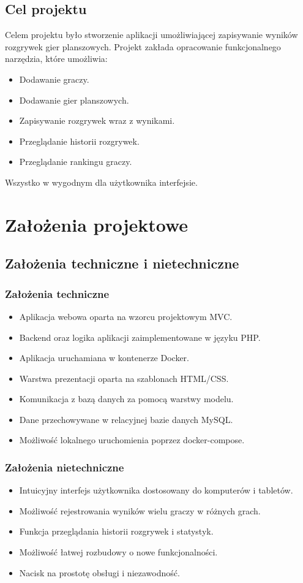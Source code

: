 \documentclass[12pt,a4paper]{article}
\begin{document}
\subsection{Cel projektu}
Celem projektu było stworzenie aplikacji umożliwiającej zapisywanie wyników rozgrywek gier planszowych. Projekt zakłada opracowanie funkcjonalnego narzędzia, które umożliwia:
\begin{itemize}
	\item Dodawanie graczy.
	\item Dodawanie gier planszowych.
	\item Zapisywanie rozgrywek wraz z wynikami.
	\item Przeglądanie historii rozgrywek.
	\item Przeglądanie rankingu graczy.
\end{itemize}
Wszystko w wygodnym dla użytkownika interfejsie.

\pagebreak
\section{Założenia projektowe}

\subsection{Założenia techniczne i nietechniczne}
\subsubsection{Założenia techniczne}
\begin{itemize}
	\item Aplikacja webowa oparta na wzorcu projektowym MVC.
	\item Backend oraz logika aplikacji zaimplementowane w języku PHP.
	\item Aplikacja uruchamiana w kontenerze Docker.
	\item Warstwa prezentacji oparta na szablonach HTML/CSS.
	\item Komunikacja z bazą danych za pomocą warstwy modelu.
	\item Dane przechowywane w relacyjnej bazie danych MySQL.
	\item Możliwość lokalnego uruchomienia poprzez docker-compose.
\end{itemize}

\subsubsection{Założenia nietechniczne}
\begin{itemize}
	\item Intuicyjny interfejs użytkownika dostosowany do komputerów i tabletów.
	\item Możliwość rejestrowania wyników wielu graczy w różnych grach.
	\item Funkcja przeglądania historii rozgrywek i statystyk.
	\item Możliwość łatwej rozbudowy o nowe funkcjonalności.
	\item Nacisk na prostotę obsługi i niezawodność.
\end{itemize}
\end{document}
